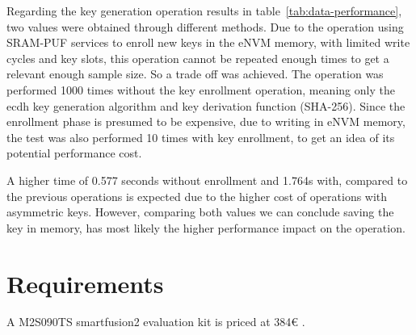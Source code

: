 

Regarding the key generation operation results in table~\ref{tab:data-performance}, two values were obtained through different methods. Due to the operation using SRAM-PUF services to enroll new keys in the eNVM memory, with limited write cycles and key slots, this operation cannot be repeated enough times to get a relevant enough sample size.
So a trade off was achieved. The operation was performed 1000 times without the key enrollment operation, meaning only the ecdh key generation algorithm and key derivation function (SHA-256).
Since the enrollment phase is presumed to be expensive, due to writing in eNVM memory, the test was also performed 10 times with key enrollment, to get an idea of its potential performance cost.

A higher time of 0.577 seconds without enrollment and 1.764s with, compared to the previous operations is expected due to the higher cost of operations with asymmetric keys.
However, comparing both values we can conclude saving the key in memory, has most likely the higher performance impact on the operation.

\section{Requirements}\label{chap:evaluation:requirements}

A M2S090TS smartfusion2 evaluation kit is priced at 384€ \cite{smartfusionPrice}.


